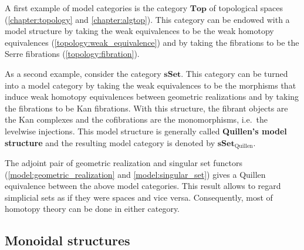     \begin{example}
        A first example of model categories is the category $\mathbf{Top}$ of topological spaces (\cref{chapter:topology} and \cref{chapter:algtop}). This category can be endowed with a model structure by taking the weak equivalences to be the weak homotopy equivalences (\cref{topology:weak_equivalence}) and by taking the fibrations to be the Serre fibrations (\cref{topology:fibration}).
    \end{example}
    \begin{example}\label{model:sset_model_structure}
        As a second example, consider the category $\mathbf{sSet}$. This category can be turned into a model category by taking the weak equivalences to be the morphisms that induce weak homotopy equivalences between geometric realizations and by taking the fibrations to be Kan fibrations. With this structure, the fibrant objects are the Kan complexes and the cofibrations are the monomorphisms, i.e.~the levelwise injections. This model structure is generally called \textbf{Quillen's model structure} and the resulting model category is denoted by $\mathbf{sSet}_{\text{Quillen}}$.
    \end{example}

    \begin{property}[Quillen]\label{cat:quillen_sset_top}
        The adjoint pair of geometric realization and singular set functors (\cref{model:geometric_realization} and \cref{model:singular_set}) gives a Quillen equivalence between the above model categories. This result allows to regard simplicial sets as if they were spaces and vice versa. Consequently, most of homotopy theory can be done in either category.
    \end{property}

\subsection{Monoidal structures}

